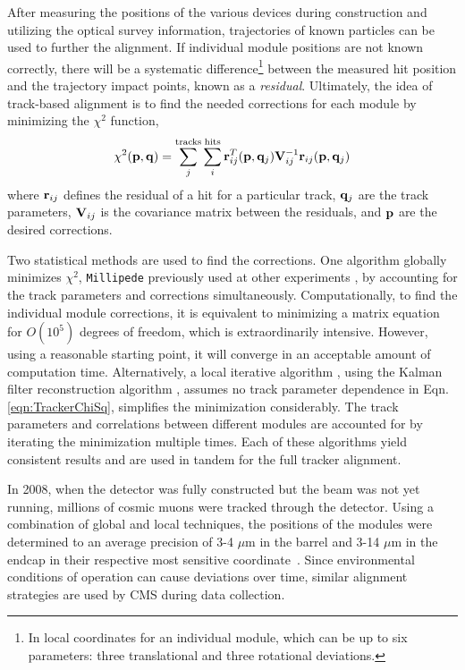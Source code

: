 After measuring the positions of the various devices during construction and utilizing the optical survey information, trajectories of known particles can be used to further the alignment. If individual module positions are not known correctly, there will be a systematic difference\footnote{In local coordinates for an individual module, which can be up to six parameters: three translational and three rotational deviations.} between the measured hit position and the trajectory impact points, known as a \textit{residual}. Ultimately, the idea of track-based alignment is to find the needed corrections for each module by minimizing the $\chi^2$ function,
\begin{equation}
\chi^2({\bf p},{\bf q})
= \sum_j^{\rm tracks}\sum_i^{\rm hits}{\bf r}_{ij}^T({\bf p},{\bf q}_j){\bf V}^{-1}_{ij}{\bf r}_{ij}({\bf p},{\bf q}_j)
\label{eqn:TrackerChiSq}
\end{equation}
where ${\bf r}_{ij}$ defines the residual of a hit for a particular track, ${\bf q}_j$ are the track parameters, ${\bf V}_{ij}$ is the covariance matrix between the residuals, and ${\bf p}$ are the desired corrections.

Two statistical methods are used to find the corrections. One algorithm globally minimizes $\chi^2$, {\tt Millipede} previously used at other experiments \cite{Blobel:2006}, by accounting for the track parameters and corrections simultaneously. Computationally, to find the individual module corrections, it is equivalent to minimizing a matrix equation for $O(10^5)$ degrees of freedom, which is extraordinarily intensive. However, using a reasonable starting point, it will converge in an acceptable amount of computation time. Alternatively, a local iterative algorithm \cite{Karimaki:2006az}, using the Kalman filter reconstruction algorithm \cite{Widl:2006mz}, assumes no track parameter dependence in Eqn. \ref{eqn:TrackerChiSq}, simplifies the minimization considerably. The track parameters and correlations between different modules are accounted for by iterating the minimization multiple times. Each of these algorithms yield consistent results and are used in tandem for the full tracker alignment.

In 2008, when the detector was fully constructed but the beam was not yet running, millions of cosmic muons were tracked through the detector. Using a combination of global and local techniques, the positions of the modules were determined to an average precision of 3-4 $\mu$m in the barrel and 3-14 $\mu$m in the endcap in their respective most sensitive coordinate~\cite{Chatrchyan:2009sr}. Since environmental conditions of operation can cause deviations over time, similar alignment strategies are used by CMS during data collection.

